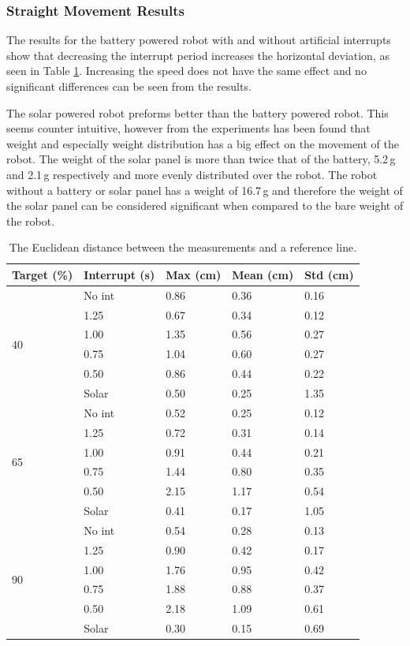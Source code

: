 \subsubsection{Straight Movement Results}

The results for the battery powered robot with and without artificial interrupts show that decreasing the interrupt period increases the horizontal deviation, as seen in Table \ref{tab:straight_results}.
Increasing the speed does not have the same effect and no significant differences can be seen from the results.

The solar powered robot preforms better than the battery powered robot.
This seems counter intuitive, however from the experiments has been found that weight and especially weight distribution has a big effect on the movement of the robot.
The weight of the solar panel is more than twice that of the battery, 5.2\,g and 2.1\,g respectively and more evenly distributed over the robot.
The robot without a battery or solar panel has a weight of 16.7\,g and therefore the weight of the solar panel can be considered significant when compared to the bare weight of the robot.

\begin{table}[t]
	\centering
	\caption{The Euclidean distance between the measurements and a reference line.}
	\label{tab:straight_results}
	\begin{tabular}{|l|l||l|l|l|}
		\hline
		Target (\%) & Interrupt (s) & Max (cm) & Mean (cm) & Std (cm)\\
		\hline \hline
		\multirow{6}{*}{40} & No int & 0.86 & 0.36 & 0.16 \\
		& 1.25 & 0.67 & 0.34 & 0.12 \\
		& 1.00 & 1.35 & 0.56 & 0.27 \\
		& 0.75 & 1.04 & 0.60 & 0.27 \\
		& 0.50 & 0.86 & 0.44 & 0.22 \\
		& Solar & 0.50 & 0.25 & 1.35 \\
		\hline
		\multirow{6}{*}{65} & No int & 0.52 & 0.25 & 0.12 \\
		& 1.25 & 0.72 & 0.31 & 0.14 \\
		& 1.00 & 0.91 & 0.44 & 0.21 \\
		& 0.75 & 1.44 & 0.80 & 0.35 \\
		& 0.50 & 2.15 & 1.17 & 0.54 \\
		& Solar & 0.41 & 0.17 & 1.05 \\
		\hline
		\multirow{6}{*}{90} & No int & 0.54 & 0.28 & 0.13 \\
		& 1.25 & 0.90 & 0.42 & 0.17 \\
		& 1.00 & 1.76 & 0.95 & 0.42 \\
		& 0.75 & 1.88 & 0.88 & 0.37 \\
		& 0.50 & 2.18 & 1.09 & 0.61 \\
		& Solar & 0.30 & 0.15 & 0.69 \\
		\hline
	\end{tabular}
\end{table}

